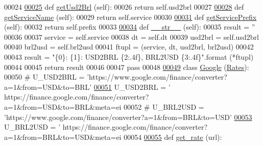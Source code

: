 \begin{DoxyCode}
00024     
\hypertarget{rates_8py_source.tex_l00025}{}\hyperlink{namespacerates_ae4c7203ef8a919f9cf522581ca00b08a}{00025}     \textcolor{keyword}{def }\hyperlink{namespacerates_ae4c7203ef8a919f9cf522581ca00b08a}{getUsd2Brl} (self):
00026         \textcolor{keywordflow}{return} self.usd2brl
00027     
\hypertarget{rates_8py_source.tex_l00028}{}\hyperlink{namespacerates_a5dd7b6601bc66e313c26984e32f1e290}{00028}     \textcolor{keyword}{def }\hyperlink{namespacerates_a5dd7b6601bc66e313c26984e32f1e290}{getServiceName} (self):
00029         \textcolor{keywordflow}{return} self.service
00030     
\hypertarget{rates_8py_source.tex_l00031}{}\hyperlink{namespacerates_aafc179b32863137b88c74dd0ee2576bd}{00031}     \textcolor{keyword}{def }\hyperlink{namespacerates_aafc179b32863137b88c74dd0ee2576bd}{getServicePrefix} (self):
00032         \textcolor{keywordflow}{return} self.prefix
00033         
\hypertarget{rates_8py_source.tex_l00034}{}\hyperlink{namespacerates_a2f1a70c33ee9e255938e4c19fd207264}{00034}     \textcolor{keyword}{def }\hyperlink{namespacerates_a2f1a70c33ee9e255938e4c19fd207264}{\_\_str\_\_} (self):
00035         result = \textcolor{stringliteral}{''}
00036 
00037         service = self.service
00038         dt      = self.dt
00039         usd2brl = self.usd2brl
00040         brl2usd = self.brl2usd
00041         ftupl = (service, dt, usd2brl, brl2usd)
00042         
00043         result = \textcolor{stringliteral}{"\{0\}: \{1\}: USD2BRL \{2:.4f\}, BRL2USD \{3:.4f\}"}.format (*ftupl)
00044 
00045         \textcolor{keywordflow}{return} result        
00046     
00047     \textcolor{keywordflow}{pass} 
00048     
\hypertarget{rates_8py_source.tex_l00049}{}\hyperlink{classrates_1_1_google}{00049} \textcolor{keyword}{class }\hyperlink{classrates_1_1_google}{Google} (\hyperlink{classrates_1_1_rates}{Rates}):
00050     \textcolor{comment}{#    U\_USD2BRL = 'https://www.google.com/finance/converter?a=1&from=USD&to=BRL'}
\hypertarget{rates_8py_source.tex_l00051}{}\hyperlink{classrates_1_1_google_a77ef7f5932c48b002697fb187a234d4a}{00051}     U\_USD2BRL = \textcolor{stringliteral}{'
      https://finance.google.com/finance/converter?a=1&from=USD&to=BRL&meta=ei%
00052 \textcolor{comment}{#    U\_BRL2USD = 'https://www.google.com/finance/converter?a=1&from=BRL&to=USD'}
\hypertarget{rates_8py_source.tex_l00053}{}\hyperlink{classrates_1_1_google_a46dbc3fa0a110bf5b66808c29642cfa1}{00053}     U\_BRL2USD = \textcolor{stringliteral}{'
      https://finance.google.com/finance/converter?a=1&from=BRL&to=USD&meta=ei%
00054 
\hypertarget{rates_8py_source.tex_l00055}{}\hyperlink{classrates_1_1_google_afa49252959b89741449dca773f2141b8}{00055}     \textcolor{keyword}{def }\hyperlink{classrates_1_1_google_afa49252959b89741449dca773f2141b8}{get\_rate} (url):
}}
\end{DoxyCode}
